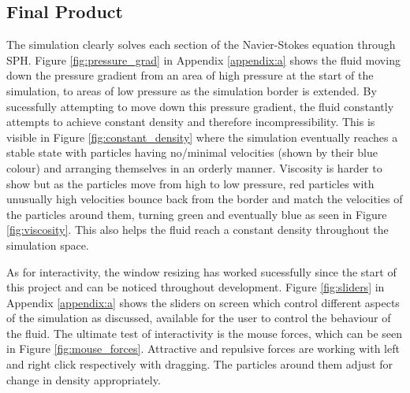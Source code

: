 \documentclass[write-up.tex]{subfiles}
\begin{document}
\subsection{Final Product}
The simulation clearly solves each section of the Navier-Stokes equation through SPH. Figure \ref{fig:pressure_grad} in Appendix \ref{appendix:a} shows the fluid moving down the pressure gradient from an area of high pressure at the start of the simulation, to areas of low pressure as the simulation border is extended. By sucessfully attempting to move down this pressure gradient, the fluid constantly attempts to achieve constant density and therefore incompressibility. This is visible in Figure \ref{fig:constant_density} where the simulation eventually reaches a stable state with particles having no/minimal velocities (shown by their blue colour) and arranging themselves in an orderly manner. Viscosity is harder to show but as the particles move from high to low pressure, red particles with unusually high velocities bounce back from the border and match the velocities of the particles around them, turning green and eventually blue as seen in Figure \ref{fig:viscosity}. This also helps the fluid reach a constant density throughout the simulation space.

As for interactivity, the window resizing has worked sucessfully since the start of this project and can be noticed throughout development. Figure \ref{fig:sliders} in Appendix \ref{appendix:a} shows the sliders on screen which control different aspects of the simulation as discussed, available for the user to control the behaviour of the fluid. The ultimate test of interactivity is the mouse forces, which can be seen in Figure \ref{fig:mouse_forces}. Attractive and repulsive forces are working with left and right click respectively with dragging. The particles around them adjust for change in density appropriately.
\end{document}
